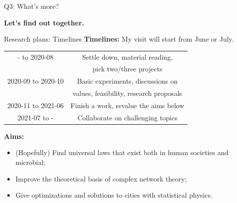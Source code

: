 \begin{frame}{Q3: What's more?}
    \begin{center}
        \textbf{Let's find out together.}
    \end{center}
\end{frame}

\begin{frame}{Research plans: Timelines}
    \textbf{Timelines:} My visit will start from June or July. 
    \begin{center}
        \begin{tabular}	{|c|c|}
        \hline
        - to 2020-08 & Settle down, material reading,\\ & pick two/three projects \\ \hline
        2020-09 to 2020-10 & Basic experiments, discussions on \\ & values, feasibility, research proposals \\ \hline
        2020-11 to 2021-06 & Finish a work, revalue the aims below\\ \hline
        2021-07 to - & Collaborate on challenging topics\\ \hline 
        \end{tabular}
    \end{center}
    \textbf{Aims:} 
    \begin{itemize}
        \item (Hopefully) Find universal laws that exist both in human societies and microbial;
        \item Improve the theoretical basis of complex network theory;
        \item Give optimizations and solutions to cities with statistical physics.
    \end{itemize} 
\end{frame}